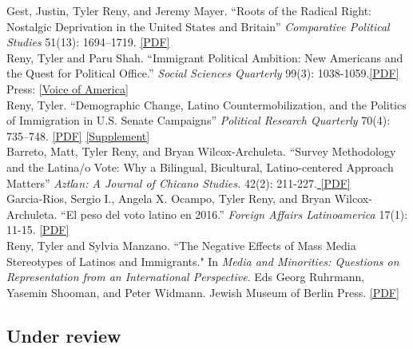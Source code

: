 \documentclass[11pt, a4paper]{article}
\newcommand{\years}[1]{\marginnote{\scriptsize #1}}
\begin{document}
\years{} Gest, Justin, Tyler Reny, and Jeremy Mayer. ``Roots of the Radical Right: Nostalgic Deprivation in the United States and Britain'' \textit{Comparative Political Studies} 51(13): 1694–1719. \href{http://tylerreny.github.io/pdf/pubs/reny_2017_cps_final.pdf}{[PDF]}\\

\years{} Reny, Tyler and Paru Shah. ``Immigrant Political Ambition:  New Americans and the Quest for Political Office.'' \textit{Social Sciences Quarterly} 99(3): 1038-1059.\href{http://tylerreny.github.io/pdf/pubs/reny_shah_2018_ssq_immigrant_ambition.pdf}{[PDF]} Press: \href{https://www.voanews.com/a/immigrants-candidates-make-a-run-for-it-in-upcoming-us-elections/4439132.html}{[Voice of America]}\\

\years{2017} Reny, Tyler. ``Demographic Change, Latino Countermobilization, and the Politics of Immigration in U.S. Senate Campaigns'' \textit{Political Research Quarterly} 70(4): 735–748. \href{http://tylerreny.github.io/pdf/pubs/reny_2017_prq_final.pdf}{[PDF]} \href{http://tylerreny.github.io/pdf/pubs/reny_2017_prq_final_supp.pdf}{[Supplement]}\\

\years{} Barreto, Matt, Tyler Reny, and Bryan Wilcox-Archuleta. ``Survey Methodology and the Latina/o Vote: Why a Bilingual, Bicultural, Latino-centered Approach Matters'' \textit{Aztl$\acute{a}$n: A Journal of Chicano Studies.} 42(2): 211-227.\href{http://tylerreny.github.io/pdf/pubs/reny_2017_aztlan_final.pdf}{ [PDF]}\\

\years{} Garcia-Rios, Sergio I., Angela X. Ocampo, Tyler Reny, and Bryan Wilcox-Archuleta. ``El peso del voto latino en 2016.'' \textit{Foreign Affairs Latinoamerica} 17(1): 11-15. \href{http://tylerreny.github.io/pdf/pubs/reny_et_al_2017_foreign_affairs.pdf}{ [PDF]}\\

\years{2016} Reny, Tyler and Sylvia Manzano. ``The Negative Effects of Mass Media Stereotypes of Latinos and Immigrants." In \textit{Media and Minorities: Questions on Representation from an International Perspective}. Eds Georg Ruhrmann, Yasemin Shooman, and Peter Widmann. Jewish Museum of Berlin Press. \href{http://tylerreny.github.io/pdf/pubs/reny_manzano_stereotypes_2016.pdf}{[PDF]}\\

\subsection*{Under review}
\end{document}
